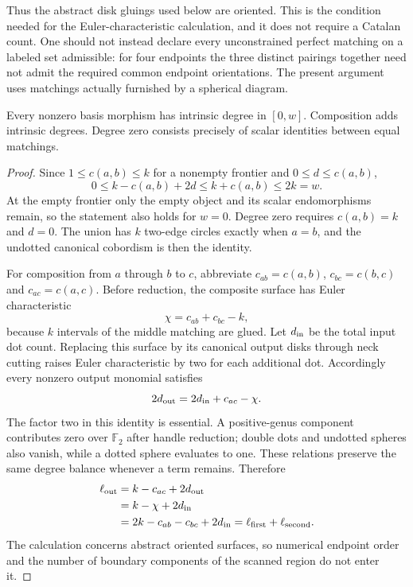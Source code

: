 Thus the abstract disk gluings used below are oriented.  This is the
condition needed for the Euler-characteristic calculation, and it does
not require a Catalan count.  One should not instead declare every
unconstrained perfect matching on a labeled set admissible: for four
endpoints the three distinct pairings together need not admit the required
common endpoint orientations.  The present argument uses matchings
actually furnished by a spherical diagram.

\begin{lemma}
\label{lem:intrinsic-grading}
Every nonzero basis morphism has intrinsic degree in $[0,w]$.
Composition adds intrinsic degrees.  Degree zero consists precisely of
scalar identities between equal matchings.
\end{lemma}

\begin{proof}
Since $1\leq c(a,b)\leq k$ for a nonempty frontier and
$0\leq d\leq c(a,b)$,
\[
 0\leq k-c(a,b)+2d\leq k+c(a,b)\leq2k=w.
\]
At the empty frontier only the empty object and its scalar endomorphisms
remain, so the statement also holds for $w=0$.  Degree zero requires
$c(a,b)=k$ and $d=0$.  The union has $k$ two-edge circles exactly when
$a=b$, and the undotted canonical cobordism is then the identity.

For composition from $a$ through $b$ to $c$, abbreviate
$c_{ab}=c(a,b)$, $c_{bc}=c(b,c)$ and $c_{ac}=c(a,c)$.  Before reduction,
the composite surface has Euler characteristic
\begin{equation}
 \chi=c_{ab}+c_{bc}-k,
 \label{eq:composite-euler}
\end{equation}
because $k$ intervals of the middle matching are glued.  Let $d_{\rm in}$
be the total input dot count.  Replacing this surface by its canonical
output disks through neck cutting raises Euler characteristic by two for
each additional dot.  Accordingly every nonzero output monomial satisfies
\begin{equation}
 2d_{\rm out}=2d_{\rm in}+c_{ac}-\chi.
 \label{eq:dot-euler-balance}
\end{equation}
The factor two in this identity is essential.  A positive-genus component
contributes zero over $\mathbb F_2$ after handle reduction; double dots and
undotted spheres also vanish, while a dotted sphere evaluates to one.
These relations preserve the same degree balance whenever a term remains.
Therefore
\begin{align*}
 \ell_{\rm out}
 &=k-c_{ac}+2d_{\rm out}\\
 &=k-\chi+2d_{\rm in}\\
 &=2k-c_{ab}-c_{bc}+2d_{\rm in}
   =\ell_{\rm first}+\ell_{\rm second}.
\end{align*}
The calculation concerns abstract oriented surfaces, so numerical endpoint
order and the number of boundary components of the scanned region do not
enter it.
\end{proof}

